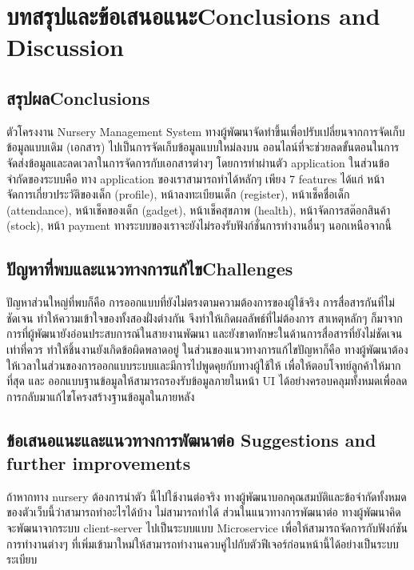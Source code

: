 \chapter{\ifcpe บทสรุปและข้อเสนอแนะ\else Conclusions and Discussion\fi}

\section{\ifcpe สรุปผล\else Conclusions\fi}

ตัวโครงงาน  Nursery Management System  ทางผู้พัฒนาจัดทำขึ้นเพื่อปรับเปลี่ยนจากการจัดเก็บข้อมูลแบบเดิม (เอกสาร) ไปเป็นการจัดเก็บข้อมูลแบบใหม่ลงบน  ออนไลน์ที่จะช่วยลดขั้นตอนในการจัดส่งข้อมูลและลดเวลาในการจัดการกับเอกสารต่างๆ โดยการทำผ่านตัว application ในส่วนข้อจำกัดของระบบคือ ทาง application ของเราสามารถทำได้หลักๆ เพียง 7 features ได้แก่ หน้าจัดการเกี่ยวประวัติของเด็ก (profile), หน้าลงทะเบียนเด็ก (register), หน้าเช็คชื่อเด็ก (attendance), หน้าเช็คของเด็ก (gadget), หน้าเช็คสุขภาพ (health), หน้าจัดการสต๊อกสินค้า (stock), หน้า payment ทางระบบของเราจะยังไม่รองรับฟังก์ชั่นการทำงานอื่นๆ นอกเหนือจากนี้

\section{\ifcpe ปัญหาที่พบและแนวทางการแก้ไข\else Challenges\fi}

ปัญหาส่วนใหญ่ที่พบก็คือ การออกแบบที่ยังไม่ตรงตามความต้องการของผู้ใช้จริง  การสื่อสารกันที่ไม่ชัดเจน ทำให้ความเข้าใจของทั้งสองฝั่งต่างกัน จึงทำให้เกิดผลลัพธ์ที่ไม่ต้องการ  สาเหตุหลักๆ ก็มาจากการที่ผู้พัฒนายังอ่อนประสบการณ์ในสายงานพัฒนา และยังขาดทักษะในด้านการสื่อสารที่ยังไม่ชัดเจนเท่าที่ควร ทำให้ชิ้นงานยังเกิดข้อผิดพลาดอยู่
ในส่วนของแนวทางการแก้ไขปัญหาก็คือ ทางผู้พัฒนาต้องให้เวลาในส่วนของการออกแบบระบบและมีการไปพูดคุยกับทางผู้ใช้ให้ เพื่อให้ตอบโจทย์ลูกค้าให้มากที่สุด และ ออกแบบฐานข้อมูลให้สามารถรองรับข้อมูลภายในหน้า UI ได้อย่างครอบคลุมทั้งหมดเพื่อลดการกลับมาแก้ไขโครงสร้างฐานข้อมูลในภายหลัง

\section{\ifcpe%
ข้อเสนอแนะและแนวทางการพัฒนาต่อ
\else%
Suggestions and further improvements
\fi
}

ถ้าหากทาง nursery ต้องการนำตัว  นี้ไปใช้งานต่อจริง ทางผู้พัฒนาบอกคุณสมบัติและข้อจำกัดทั้งหมดของตัวเว็บนี้ว่าสามารถทำอะไรได้บ้าง ไม่สามารถทำได้
ส่วนในแนวทางการพัฒนาต่อ  ทางผู้พัฒนาคิดจะพัฒนาจากระบบ client-server ไปเป็นระบบแบบ Microservice เพื่อให้สามารถจัดการกับฟังก์ชันการทำงานต่างๆ ที่เพิ่มเข้ามาใหม่ให้สามารถทำงานควบคู่ไปกับตัวฟีเจอร์ก่อนหน้านี้ได้อย่างเป็นระบบระเบียบ

